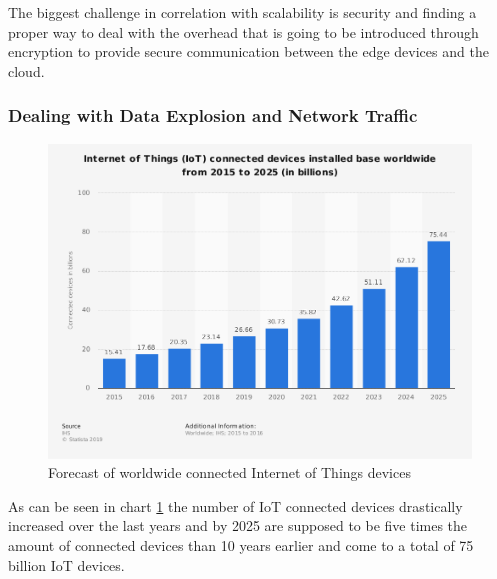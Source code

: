 The biggest challenge in correlation with scalability is security and finding a proper way to deal with the overhead that is going to be introduced through encryption to provide secure communication between the edge devices and the cloud.

\subsubsection{Dealing with Data Explosion and Network Traffic}\hspace*{\fill} \begin{figure}[H]
    \centering
    \includegraphics[width=1\textwidth]{resources/images/global_iot_devices.png}
    \caption{Forecast of worldwide connected Internet of Things devices}
    \label{fig:global_iot_devices}
\end{figure}

As can be seen in chart \ref{fig:global_iot_devices} the number of IoT connected devices drastically increased over the last years and by 2025 are supposed to be five times the amount of connected devices than 10 years earlier and come to a total of 75 billion IoT devices.

